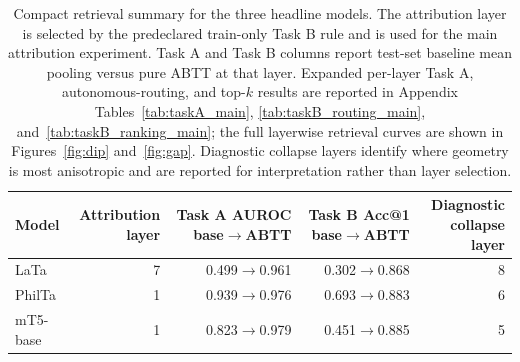 \begin{table}[t]
\centering
\small
\setlength{\tabcolsep}{5pt}
\begin{tabular}{lrrrr}
\toprule
\textbf{Model} & \makecell{\textbf{Attribution}\\\textbf{layer}} & \makecell{\textbf{Task A AUROC}\\\textbf{base$\rightarrow$ABTT}} & \makecell{\textbf{Task B Acc@1}\\\textbf{base$\rightarrow$ABTT}} & \makecell{\textbf{Diagnostic}\\\textbf{collapse layer}} \\
\midrule
LaTa & 7 & 0.499$\rightarrow$0.961 & 0.302$\rightarrow$0.868 & 8 \\
PhilTa & 1 & 0.939$\rightarrow$0.976 & 0.693$\rightarrow$0.883 & 6 \\
mT5-base & 1 & 0.823$\rightarrow$0.979 & 0.451$\rightarrow$0.885 & 5 \\
\bottomrule
\end{tabular}
\caption{Compact retrieval summary for the three headline models. The attribution layer is selected by the predeclared train-only Task B rule and is used for the main attribution experiment. Task A and Task B columns report test-set baseline mean pooling versus pure ABTT at that layer. Expanded per-layer Task A, autonomous-routing, and top-$k$ results are reported in Appendix Tables~\ref{tab:taskA_main}, \ref{tab:taskB_routing_main}, and~\ref{tab:taskB_ranking_main}; the full layerwise retrieval curves are shown in Figures~\ref{fig:dip} and~\ref{fig:gap}. Diagnostic collapse layers identify where geometry is most anisotropic and are reported for interpretation rather than layer selection.}
\label{tab:retrieval_summary_main}
\end{table}
